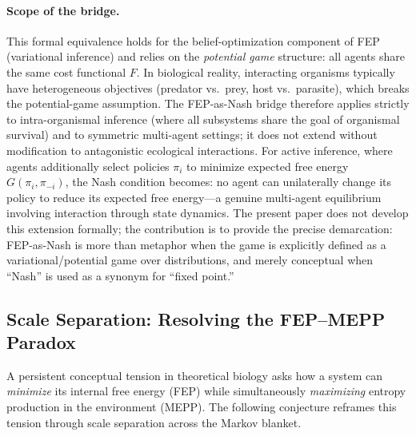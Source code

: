 \documentclass[12pt,a4paper]{article}
\theoremstyle{remark}
\begin{document}
\paragraph{Scope of the bridge.} This formal equivalence holds for the belief-optimization component of FEP (variational inference) and relies on the \emph{potential game} structure: all agents share the same cost functional $F$. In biological reality, interacting organisms typically have heterogeneous objectives (predator vs.\ prey, host vs.\ parasite), which breaks the potential-game assumption. The FEP-as-Nash bridge therefore applies strictly to intra-organismal inference (where all subsystems share the goal of organismal survival) and to symmetric multi-agent settings; it does not extend without modification to antagonistic ecological interactions. For active inference, where agents additionally select policies $\pi_i$ to minimize expected free energy $G(\pi_i, \pi_{-i})$, the Nash condition becomes: no agent can unilaterally change its policy to reduce its expected free energy---a genuine multi-agent equilibrium involving interaction through state dynamics. The present paper does not develop this extension formally; the contribution is to provide the precise demarcation: FEP-as-Nash is more than metaphor when the game is explicitly defined as a variational/potential game over distributions, and merely conceptual when ``Nash'' is used as a synonym for ``fixed point.''

\subsection{Scale Separation: Resolving the FEP--MEPP Paradox}
\label{sec:fep-mepp-paradox}

A persistent conceptual tension in theoretical biology asks how a system
can \emph{minimize} its internal free energy (FEP) while simultaneously
\emph{maximizing} entropy production in the environment (MEPP). The
following conjecture reframes this tension through scale separation
across the Markov blanket.
\end{document}
